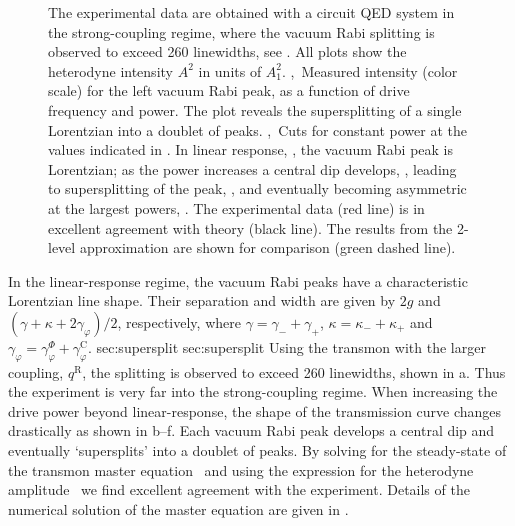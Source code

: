 \begin{figure}
 \centering
 \caption[Supersplitting of the vacuum Rabi resonance]{ The experimental data are obtained with a circuit QED system in the strong-coupling regime, where the vacuum Rabi splitting is observed to exceed 260 linewidths, see .  All plots show the  heterodyne intensity $A^2$ in units of $A_1^2$. ,~Measured intensity (color scale) for the left vacuum Rabi peak, as a function of drive frequency and power. The plot reveals the supersplitting of a single Lorentzian into a doublet of peaks. ,~Cuts for constant power at the values indicated in . In linear response, , the vacuum Rabi peak is Lorentzian; as  the power increases a central dip develops, , leading to supersplitting of the peak, , and eventually becoming asymmetric at the largest powers, . The experimental data (red line) is in excellent agreement with theory (black line). The results from the 2-level approximation are shown for comparison (green dashed line).\label{fig:exp}}
\end{figure}%
In the linear-response regime, the vacuum Rabi peaks have a characteristic Lorentzian line shape. Their separation and width are given by $2g$ and $(\gamma+\kappa+2\gamma_\varphi)/2$, respectively, where $\gamma=\gamma_-+\gamma_+$, $\kappa=\kappa_-+\kappa_+$ and $\gamma_\varphi=\gamma^\Phi_\varphi+\gamma^\text{C}_\varphi$.%
        {sec:supersplit}%
        {sec:supersplit}
Using the transmon with the larger coupling, $q^\text{R}$, the splitting is observed to exceed 260 linewidths, shown in a. Thus the experiment is very far into the strong-coupling regime. When increasing the drive power beyond linear-response, the shape of the transmission curve changes drastically as shown in b--f. Each vacuum Rabi peak develops a central dip and eventually `supersplits' into a doublet of peaks. By solving for the steady-state of the transmon master equation~ and using the expression for the heterodyne amplitude~ we find excellent agreement with the experiment. Details of the numerical solution of the master equation are given in .

